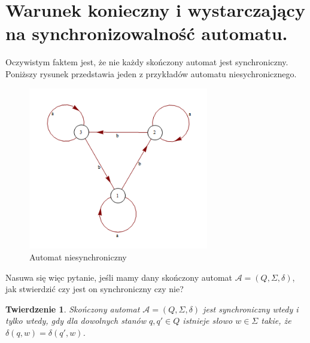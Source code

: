 \documentclass[12pt,a4paper]{article}
\newtheorem{twr}{Twierdzenie}[section]
\begin{document}
\section{Warunek konieczny i wystarczaj\k{a}cy na synchronizowalno\'{s}\'{c} automatu.}

Oczywistym faktem jest, \.{z}e nie ka\.{z}dy sko\'{n}czony automat jest synchroniczny. Poni\.{z}szy rysunek przedstawia jeden z przyk{\l}ad\'{o}w automatu niesychronicznego.

\begin{figure}[H]
    \includegraphics[width=0.7\textwidth]{rysunek8}
    \caption{Automat niesynchroniczny}
    \label{fig:rysunek8}
\end{figure}

Nasuwa si\k{e} wi\k{e}c pytanie, je\'{s}li mamy dany sko\'{n}czony automat $\mathscr{A}=(Q, \Sigma, \delta)$, jak stwierdzi\'{c} czy jest on synchroniczny czy nie?

\begin{twr}
\label{tw:twierdzenie1}
Sko\'{n}czony automat $\mathscr{A}=(Q, \Sigma, \delta)$ jest synchroniczny wtedy i tylko wtedy, gdy dla dowolnych stan\'{o}w $q, q' \in Q$ istnieje s{\l}owo $w \in \Sigma$ takie, \.{z}e $\delta(q,w)=\delta(q',w)$.
\end{twr}
\end{document}
